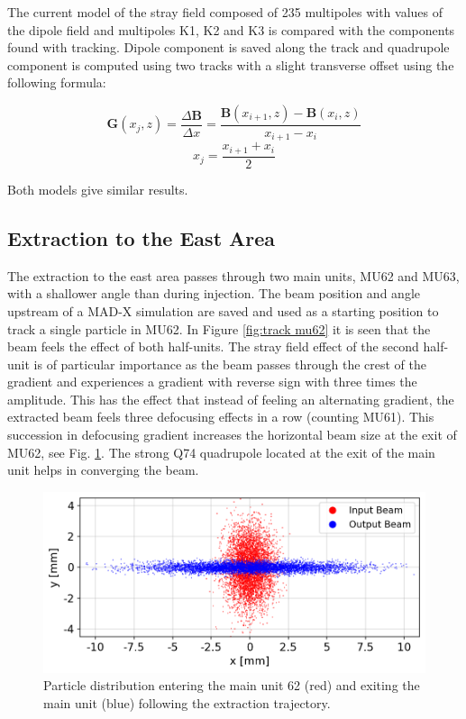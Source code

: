 \documentclass[a4paper,
               biblatex,     %
               keeplastbox,   %
               ]{jacow}
\begin{document}
The current model of the stray field composed of 235 multipoles with values of the dipole field and multipoles K1, K2 and K3 is compared with the components found with tracking. Dipole component is saved along the track and quadrupole component is computed using two tracks with a slight transverse offset using the following formula:

$$ \boldsymbol{G}(x_{j},z) = \frac{\Delta\boldsymbol{B}}{\Delta x} = \frac{\boldsymbol{B}(x_{i+1},z) - \boldsymbol{B}(x_{i},z)}{x_{i+1}-x_{i}} $$
$$ x_{j} = \frac{x_{i+1} + x_{i}}{{2}} $$

Both models give similar results.


\subsection{Extraction to the East Area}
The extraction to the east area passes through two main units, MU62 and MU63, with a shallower angle than during injection. The beam position and angle upstream of a MAD-X simulation are saved and used as a starting position to track a single particle in MU62. In Figure \ref{fig:track mu62} it is seen that the beam feels the effect of both half-units. The stray field effect of the second half-unit is of particular importance as the beam passes through the crest of the gradient and experiences a gradient with reverse sign with three times the amplitude. This has the effect that instead of feeling an alternating gradient, the extracted beam feels three defocusing effects in a row (counting MU61). This succession in defocusing gradient increases the horizontal beam size at the exit of MU62, see Fig. \ref{fig:particle_distribution}. The strong Q74 quadrupole located at the exit of the main unit helps in converging the beam.

\begin{figure}[!htb]
   \centering
   \includegraphics*[width=1.0\columnwidth]{particle_distribution.png}
   \caption{Particle distribution entering the main unit 62 (red) and exiting the main unit (blue) following the extraction trajectory.}
   \label{fig:particle_distribution}
\end{figure}
\end{document}
